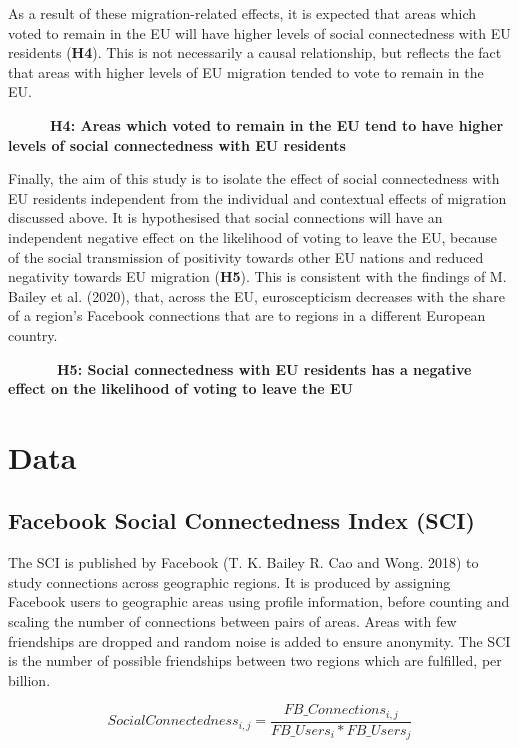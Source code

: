 \documentclass{article}
\begin{document}
As a result of these migration-related effects, it is expected that
areas which voted to remain in the EU will have higher levels of social
connectedness with EU residents (\textbf{H4}). This is not necessarily a
causal relationship, but reflects the fact that areas with higher levels
of EU migration tended to vote to remain in the EU.

~~~~~~\textbf{H4: Areas which voted to remain in the EU tend to have
higher levels of social connectedness with EU residents}

Finally, the aim of this study is to isolate the effect of social
connectedness with EU residents independent from the individual and
contextual effects of migration discussed above. It is hypothesised that
social connections will have an independent negative effect on the
likelihood of voting to leave the EU, because of the social transmission
of positivity towards other EU nations and reduced negativity towards EU
migration (\textbf{H5}). This is consistent with the findings of M.
Bailey et al. (2020), that, across the EU, euroscepticism decreases with
the share of a region's Facebook connections that are to regions in a
different European country.

~~~~~~~\textbf{H5: Social connectedness with EU residents has a negative
effect on the likelihood of voting to leave the EU}

\hypertarget{data}{%
\section{Data}\label{data}}

\hypertarget{facebook-social-connectedness-index-sci}{%
\subsection{Facebook Social Connectedness Index
(SCI)}\label{facebook-social-connectedness-index-sci}}

The SCI is published by Facebook (T. K. Bailey R. Cao and Wong. 2018) to
study connections across geographic regions. It is produced by assigning
Facebook users to geographic areas using profile information, before
counting and scaling the number of connections between pairs of areas.
Areas with few friendships are dropped and random noise is added to
ensure anonymity. The SCI is the number of possible friendships between
two regions which are fulfilled, per billion.

\[Social Connectedness_{i,j} = \frac{FB\_Connections_{i,j}}{FB\_Users_{i}*FB\_Users_{j}}\]
\end{document}
